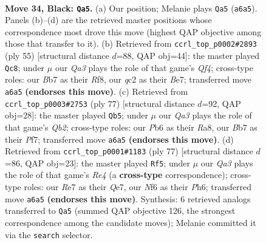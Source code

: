 \documentclass[11pt]{article}
\begin{document}
\clearpage

\begin{figure}[p]\centering
\begin{subfigure}{0.46\textwidth}\centering
\resizebox{\linewidth}{!}{%
\newchessgame
\chessboard[
  setfen={4rk2/1b2rp2/qp3n2/1N1p2NP/P2P4/5KR1/2Q5/7R b - - 3 34},
  showmover=false,
  pgfstyle=straightmove, color=movearrow, markmove={a6-a5}
]}
\caption{}
\end{subfigure}\hfill
\begin{subfigure}{0.46\textwidth}\centering
\resizebox{\linewidth}{!}{%
\newchessgame
\chessboard[
  setfen={3r1r1k/1pn1b1pp/2p5/2P2q2/1P2NN2/6P1/Q6P/4RRK1 b - - 5 28},
  showmover=false,
  pgfstyle=straightmove, color=movearrow, markmove={f5-c8}
]}
\caption{}
\end{subfigure}
\\[4pt]
\begin{subfigure}{0.46\textwidth}\centering
\resizebox{\linewidth}{!}{%
\newchessgame
\chessboard[
  setfen={r3r1k1/1q3p2/2Nbp3/6P1/pP1P3p/5Q2/1PR3K1/2R5 b - - 0 39},
  showmover=false,
  pgfstyle=straightmove, color=movearrow, markmove={b7-b5}
]}
\caption{}
\end{subfigure}\hfill
\begin{subfigure}{0.46\textwidth}\centering
\resizebox{\linewidth}{!}{%
\newchessgame
\chessboard[
  setfen={8/p3q1bk/P1p3pp/1n1rr3/4N3/1R1P3P/5BP1/2Q2R1K b - - 0 39},
  showmover=false,
  pgfstyle=straightmove, color=movearrow, markmove={e5-f5}
]}
\caption{}
\end{subfigure}
\caption{\textbf{Move 34, Black: \texttt{Qa5}.} (a) Our position; Melanie plays \texttt{Qa5} (\texttt{a6a5}). Panels (b)--(d) are the retrieved master positions whose correspondence most drove this move (highest QAP objective among those that transfer to it). (b) Retrieved from \texttt{ccrl\_top\_p0002\#2893} (ply 55) [structural distance $d$=88, QAP obj=44]: the master played \texttt{Qc8}; under $\mu$ our \emph{Qa3} plays the role of that game's \emph{Qf4}; cross-type roles: our \emph{B}b7 as their \emph{R}f8, our \emph{q}c2 as their \emph{B}e7; transferred move \texttt{a6a5} \textbf{(endorses this move)}. (c) Retrieved from \texttt{ccrl\_top\_p0003\#2753} (ply 77) [structural distance $d$=92, QAP obj=28]: the master played \texttt{Qb5}; under $\mu$ our \emph{Qa3} plays the role of that game's \emph{Qb2}; cross-type roles: our \emph{P}b6 as their \emph{R}a8, our \emph{B}b7 as their \emph{P}f7; transferred move \texttt{a6a5} \textbf{(endorses this move)}. (d) Retrieved from \texttt{ccrl\_top\_p0001\#1183} (ply 77) [structural distance $d$=86, QAP obj=23]: the master played \texttt{Rf5}; under $\mu$ our \emph{Qa3} plays the role of that game's \emph{Re4} (a \textbf{cross-type} correspondence); cross-type roles: our \emph{R}e7 as their \emph{Q}e7, our \emph{N}f6 as their \emph{P}h6; transferred move \texttt{a6a5} \textbf{(endorses this move)}. Synthesis: 6 retrieved analogs transferred to \texttt{Qa5} (summed QAP objective 126, the strongest correspondence among the candidate moves); Melanie committed it via the \texttt{search} selector.}
\label{fig:thought-m67}
\end{figure}
\end{document}
